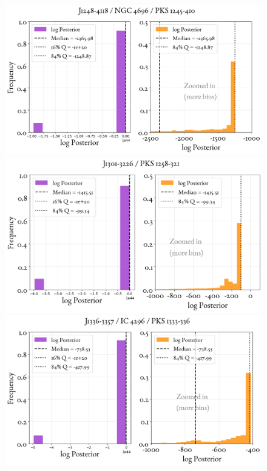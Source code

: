 \begin{figure}
    \centering
    \includegraphics[width=0.8\linewidth]{figures/ResultPosteriors/51_Posterior_4126.png}\\
     \includegraphics[width=0.8\linewidth]{figures/ResultPosteriors/52_Posterior_4164.png}\\
      \includegraphics[width=0.8\linewidth]{figures/ResultPosteriors/55_Posterior_4287.png}  
\end{figure}

